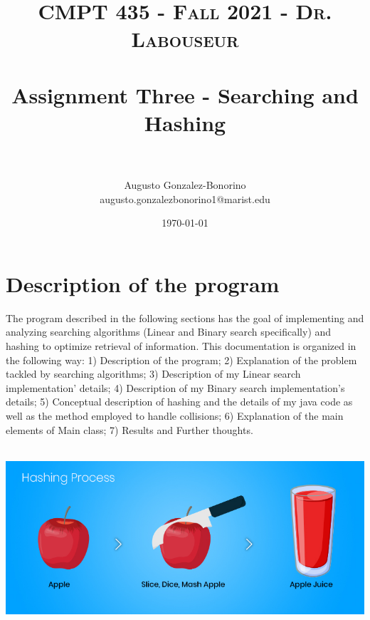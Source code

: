 \documentclass[letterpaper, 10pt]{article}
\title{	
   \normalfont \normalsize 
   \textsc{CMPT 435 - Fall 2021 - Dr. Labouseur} \\[10pt] %
   \horrule{0.5pt} \\[0.25cm] 	%
   \huge Assignment Three - Searching and Hashing \\     	    %
   \horrule{0.5pt} \\[0.25cm] 	%
}
\author{Augusto Gonzalez-Bonorino \\ \normalsize augusto.gonzalezbonorino1@marist.edu}
\date{\normalsize\today} 	%
\begin{document}
\maketitle %



\section{Description of the program}

The program described in the following sections has the goal of implementing and analyzing searching algorithms (Linear and Binary search specifically) and hashing to optimize retrieval of information. This documentation is organized in the following way: 1) Description of the program; 2) Explanation of the problem tackled by searching algorithms; 3) Description of my Linear search implementation' details; 4) Description of my Binary search implementation's details; 5) Conceptual description of hashing and the details of my java code as well as the method employed to handle collisions; 6) Explanation of the main elements of Main class; 7) Results and Further thoughts.
\\
\\
\begin{center}
    \includegraphics[scale=0.40]{images/Hashing-definition.jpg}
\end{center}
\\
\end{document}
